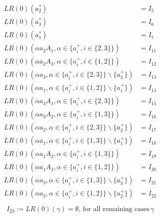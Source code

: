\begin{equation*}
\begin{split}
LR(0)(a_2^*) &= I_5\\
LR(0)(a_3^*) &= I_6\\
LR(0)(a_1^*) &= I_7\\
LR(0)(\alpha a_2A_1, \alpha \in \{a_i^+, i \in \{2, 3\}\}) &= I_{11}\\
LR(0)(\alpha a_2A_3, \alpha \in \{a_i^+, i \in \{1, 2\}\}) &= I_{12}\\
LR(0)(\alpha a_3, \alpha \in \{a_i^+, i \in \{2, 3\}\} \backslash \{a_3^+\}) &= I_{13}\\
LR(0)(\alpha a_1, \alpha \in \{a_i^+, i \in \{1, 2\}\} \backslash \{a_1^+\}) &= I_{14}\\
LR(0)(\alpha a_3A_1, \alpha \in \{a_i^+, i \in \{2, 3\}\}) &= I_{15}\\
LR(0)(\alpha a_3A_2, \alpha \in \{a_i^+, i \in \{1, 3\}\}) &= I_{16}\\
LR(0)(\alpha a_2, \alpha \in \{a_i^+, i \in \{2, 3\}\} \backslash \{a_2^+\}) &= I_{17}\\
LR(0)(\alpha a_1, \alpha \in \{a_i^+, i \in \{1, 3\}\} \backslash \{a_1^+\}) &= I_{18}\\
LR(0)(\alpha a_1A_2, \alpha \in \{a_i^+, i \in \{1, 3\}\}) &= I_{19}\\
LR(0)(\alpha a_1A_3, \alpha \in \{a_i^+, i \in \{1, 2\}\}) &= I_{20}\\
LR(0)(\alpha a_3, \alpha \in \{a_i^+, i \in \{1, 3\}\} \backslash \{a_3^+\}) &= I_{21}\\
LR(0)(\alpha a_2, \alpha \in \{a_i^+, i \in \{1, 2\}\} \backslash \{a_2^+\}) &= I_{22}\\
\end{split}
\end{equation*}
\begin{equation*}
\begin{split}
	I_{23} := LR(0)(\gamma) = \emptyset \text{, for all remaining cases} \,\gamma
\end{split}
\end{equation*}
